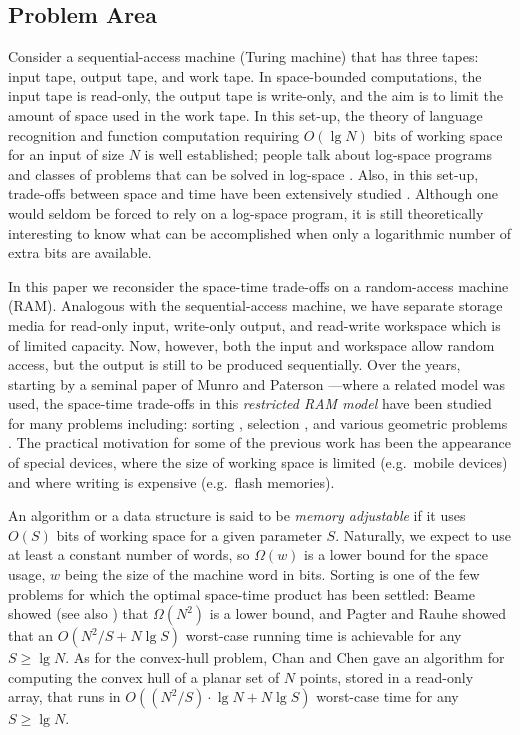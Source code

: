 \documentclass[final,onetabnum,onefignum,onethmnum]{siamltex}
\begin{document}
\subsection{Problem Area}  Consider a sequential-access machine (Turing
machine) that has three tapes: input tape, output tape, and work
tape. In space-bounded computations, the input tape is read-only, the
output tape is write-only, and the aim is to limit the amount of space
used in the work tape. In this set-up, the theory of language
recognition and function computation requiring $O(\lg N)$ bits of
working space for an input of size $N$ is well established; people
talk about log-space programs \cite[Section 3.9.3]{Sav08} and classes
of problems that can be solved in log-space \cite[Section
  8.5.3]{Sav08}. Also, in this set-up, trade-offs between space and
time have been extensively studied \cite[Chapter 10]{Sav08}.  Although
one would seldom be forced to rely on a log-space program, it is still
theoretically interesting to know what can be accomplished when only a
logarithmic number of extra bits are available.

In this paper we reconsider the space-time trade-offs on a
random-access machine (RAM).  Analogous with the sequential-access
machine, we have separate storage media for read-only input, write-only
output, and read-write workspace which is of limited capacity.  Now,
however, both the input and workspace allow random access, but the
output is still to be produced sequentially.  Over the years, starting
by a seminal paper of Munro and Paterson \cite{MP80}---where a related
model was used, the space-time trade-offs in this \emph{restricted RAM
  model} have been studied for many problems including: sorting
\cite{Fre87,PR98}, selection \cite{EJKS14,Fre87}, and various
geometric problems \cite{ABBKMRS11,BKLSS15,DNR12,DNR15}.  The practical
motivation for some of the previous work has been the appearance of
special devices, where the size of working space is limited
(e.g.~mobile devices) and where writing is expensive (e.g.~flash
memories).

An algorithm or a data structure is said to be \emph{memory
  adjustable} if it uses $O(S)$ bits of working space for a given
parameter $S$.  Naturally, we expect to use at least a constant number of words, 
so $\Omega(w)$ is a lower bound for the space usage, $w$ being the size
of the machine word in bits. Sorting is one of the few problems for
which the optimal space-time product has been settled: Beame showed
\cite{Bea91} (see also \cite[Theorem 10.13.8]{Sav08}) that
$\Omega(N^2)$ is a lower bound, and Pagter and Rauhe showed
\cite{PR98} that an $O(N^2/S + N \lg S)$ worst-case running time is
achievable for any $S \geq \lg N$.
As for the convex-hull problem, Chan and Chen \cite{CC07} gave an
algorithm for computing the convex hull of a planar set of $N$ points,
stored in a read-only array, that runs in $O((N^2/S) \cdot \lg N + N
\lg S)$ worst-case time for any $S \geq \lg N$.
\end{document}
